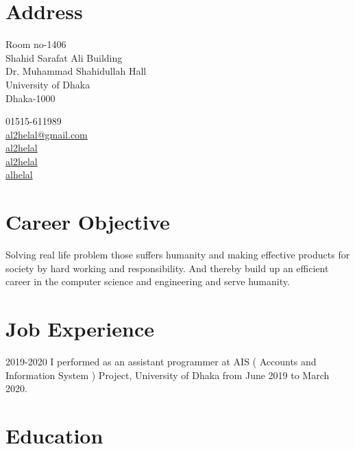 \documentclass[a4paper,12pt]{article}
\begin{document}
\section{Address}
\noindent
\begin{minipage}{.7\textwidth}
  Room no-1406\\
  Shahid Sarafat Ali Building\\
  Dr. Muhammad Shahidullah Hall\\
  University of Dhaka\\
  Dhaka-1000\\
\end{minipage}
\begin{minipage}{.7\textwidth}
  \faPhone{} 01515-611989\\
  \faEnvelopeO{}  \href{mailto:al2helal@gmail.com}{al2helal@gmail.com}\\
  \faGithub{}  \href{https://github.com/al2helal}{al2helal}\\
  \faLinkedin{}  \href{https://www.linkedin.com/in/mdalhelal/}{al2helal}\\
  \faStackOverflow{}  \href{https://stackoverflow.com/users/5697418/alhelal}{alhelal}
\end{minipage}

\section{Career Objective}
\begin{CV}
\item Solving real life problem those suffers humanity and making effective products for society by hard working and responsibility. And thereby build up an efficient career in the computer science and engineering and serve humanity.
  \end{CV}

\section{Job Experience}

\begin{CV}

\item[2019-2020] I performed as an assistant programmer at AIS ( Accounts and Information System ) Project, University of Dhaka from June 2019 to March 2020.
\end{CV}


\section{Education}
\end{document}
